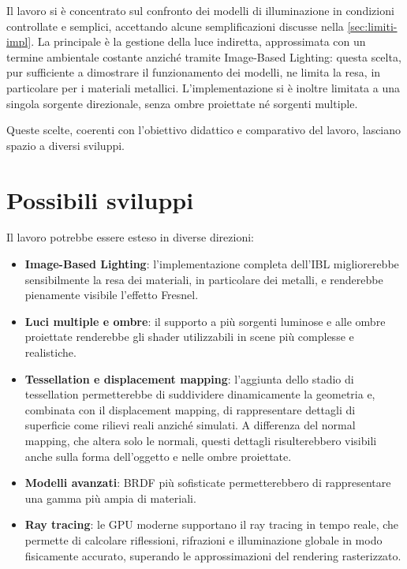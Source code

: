 \documentclass[12pt,a4paper,twoside]{book}
\begin{document}
Il lavoro si è concentrato sul confronto dei modelli di illuminazione in condizioni controllate e semplici, accettando alcune semplificazioni discusse nella \cref{sec:limiti-impl}. La principale è la gestione della luce indiretta, approssimata con un termine ambientale costante anziché tramite Image-Based Lighting: questa scelta, pur sufficiente a dimostrare il funzionamento dei modelli, ne limita la resa, in particolare per i materiali metallici. L'implementazione si è inoltre limitata a una singola sorgente direzionale, senza ombre proiettate né sorgenti multiple.

Queste scelte, coerenti con l'obiettivo didattico e comparativo del lavoro, lasciano spazio a diversi sviluppi.

\section{Possibili sviluppi}

Il lavoro potrebbe essere esteso in diverse direzioni:
\begin{itemize}
    \item \textbf{Image-Based Lighting}: l'implementazione completa dell'IBL migliorerebbe sensibilmente la resa dei materiali, in particolare dei metalli, e renderebbe pienamente visibile l'effetto Fresnel.
    \item \textbf{Luci multiple e ombre}: il supporto a più sorgenti luminose e alle ombre proiettate renderebbe gli shader utilizzabili in scene più complesse e realistiche.
    \item \textbf{Tessellation e displacement mapping}: l'aggiunta dello stadio di tessellation permetterebbe di suddividere dinamicamente la geometria e, combinata con il displacement mapping, di rappresentare dettagli di superficie come rilievi reali anziché simulati. A differenza del normal mapping, che altera solo le normali, questi dettagli risulterebbero visibili anche sulla forma dell'oggetto e nelle ombre proiettate.
    \item \textbf{Modelli avanzati}: BRDF più sofisticate permetterebbero di rappresentare una gamma più ampia di materiali.
    \item \textbf{Ray tracing}: le GPU moderne supportano il ray tracing in tempo reale, che permette di calcolare riflessioni, rifrazioni e illuminazione globale in modo fisicamente accurato, superando le approssimazioni del rendering rasterizzato.
\end{itemize}


\renewcommand{\bibsection}{}
\end{document}
